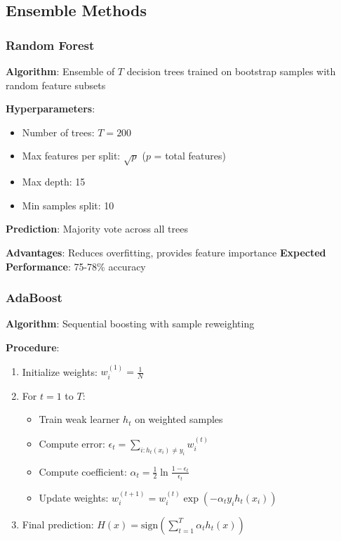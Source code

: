 \subsection{Ensemble Methods}

\subsubsection{Random Forest}

\textbf{Algorithm}: Ensemble of $T$ decision trees trained on bootstrap samples with random feature subsets

\textbf{Hyperparameters}:
\begin{itemize}
\item Number of trees: $T = 200$
\item Max features per split: $\sqrt{p}$ ($p$ = total features)
\item Max depth: 15
\item Min samples split: 10
\end{itemize}

\textbf{Prediction}: Majority vote across all trees

\textbf{Advantages}: Reduces overfitting, provides feature importance
\textbf{Expected Performance}: 75-78\% accuracy

\subsubsection{AdaBoost}

\textbf{Algorithm}: Sequential boosting with sample reweighting

\textbf{Procedure}:
\begin{enumerate}
\item Initialize weights: $w_i^{(1)} = \frac{1}{N}$
\item For $t = 1$ to $T$:
\begin{itemize}
\item Train weak learner $h_t$ on weighted samples
\item Compute error: $\epsilon_t = \sum_{i: h_t(x_i) \neq y_i} w_i^{(t)}$
\item Compute coefficient: $\alpha_t = \frac{1}{2} \ln \frac{1-\epsilon_t}{\epsilon_t}$
\item Update weights: $w_i^{(t+1)} = w_i^{(t)} \exp(-\alpha_t y_i h_t(x_i))$
\end{itemize}
\item Final prediction: $H(x) = \text{sign}(\sum_{t=1}^{T} \alpha_t h_t(x))$
\end{enumerate}

